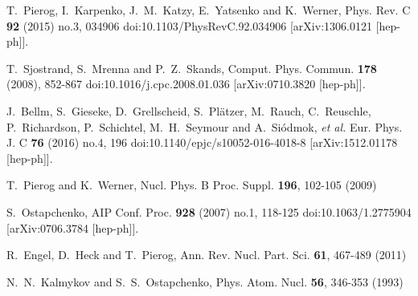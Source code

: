 \begin{thebibliography}{99}
T.~Pierog, I.~Karpenko, J.~M.~Katzy, E.~Yatsenko and K.~Werner,
Phys. Rev. C \textbf{92} (2015) no.3, 034906
doi:10.1103/PhysRevC.92.034906
[arXiv:1306.0121 [hep-ph]].

T.~Sjostrand, S.~Mrenna and P.~Z.~Skands,
Comput. Phys. Commun. \textbf{178} (2008), 852-867
doi:10.1016/j.cpc.2008.01.036
[arXiv:0710.3820 [hep-ph]].

J.~Bellm, S.~Gieseke, D.~Grellscheid, S.~Pl\"atzer, M.~Rauch, C.~Reuschle, P.~Richardson, P.~Schichtel, M.~H.~Seymour and A.~Si\'odmok, \textit{et al.}
Eur. Phys. J. C \textbf{76} (2016) no.4, 196
doi:10.1140/epjc/s10052-016-4018-8
[arXiv:1512.01178 [hep-ph]].


T.~Pierog and K.~Werner,
Nucl. Phys. B Proc. Suppl. \textbf{196}, 102-105 (2009)

S.~Ostapchenko,
AIP Conf. Proc. \textbf{928} (2007) no.1, 118-125
doi:10.1063/1.2775904
[arXiv:0706.3784 [hep-ph]].

R.~Engel, D.~Heck and T.~Pierog,
Ann. Rev. Nucl. Part. Sci. \textbf{61}, 467-489 (2011)


N.~N.~Kalmykov and S.~S.~Ostapchenko,
Phys. Atom. Nucl. \textbf{56}, 346-353 (1993)





\end{thebibliography}
